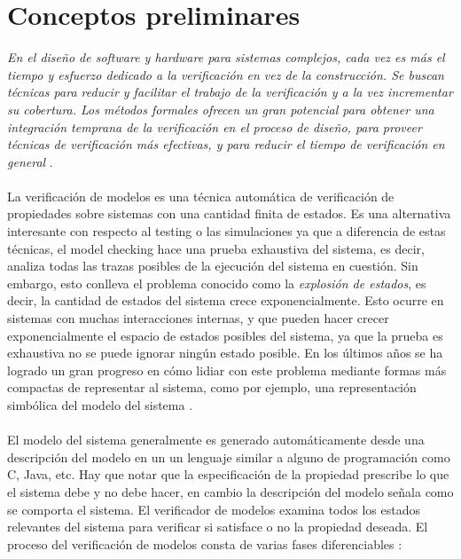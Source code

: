 \chapter{Conceptos preliminares}

\textit{En el diseño de software y hardware para sistemas complejos, cada vez es más el tiempo y esfuerzo dedicado a la verificación en vez de la construcción. Se buscan técnicas para reducir y facilitar el trabajo de la verificación y a la vez incrementar su cobertura. Los métodos formales ofrecen un gran potencial para obtener una integración temprana de la verificación en el proceso de diseño, para proveer técnicas de verificación más efectivas, y para reducir el tiempo de verificación en general} \cite{Baier:2}.\\
\\
La verificación de modelos es una técnica automática de verificación de propiedades sobre sistemas con una cantidad finita de estados. Es una alternativa interesante con respecto al testing o las simulaciones ya que a diferencia de estas técnicas, el model checking hace una prueba exhaustiva del sistema, es decir, analiza todas las trazas posibles de la ejecución del sistema en cuestión. Sin embargo, esto conlleva el problema conocido como la \emph{explosión de estados}, es decir, la cantidad de estados del sistema crece exponencialmente. Esto ocurre en sistemas con muchas interacciones internas, y que pueden hacer crecer exponencialmente el espacio de estados posibles del sistema, ya que la prueba es exhaustiva no se puede ignorar ningún estado posible. En los últimos años se ha logrado un gran progreso en cómo lidiar con este problema mediante formas más compactas de representar al sistema, como por ejemplo, una representación simbólica del modelo del sistema \cite{Bryant:8} \cite{Burch:4}.\\
\\
El modelo del sistema generalmente es generado automáticamente desde una descripción del modelo en un un lenguaje similar a alguno de programación como C, Java, etc. Hay que notar que la especificación de la propiedad prescribe lo que el sistema debe y no debe hacer, en cambio la descripción del modelo señala como se comporta el sistema. El verificador de modelos examina todos los estados relevantes del sistema para verificar si satisface o no la propiedad deseada. El proceso del verificación de modelos consta de varias fases diferenciables \cite{Baier:2}:\\
